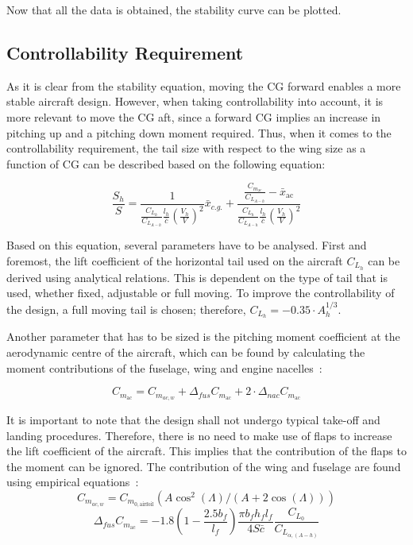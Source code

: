 Now that all the data is obtained, the stability curve can be plotted.

\subsection{Controllability Requirement} \label{subsec:Control_horiz}
As it is clear from the stability equation, moving the CG forward enables a more stable aircraft design.
However, when taking controllability into account, it is more relevant to move the CG aft,
since a forward CG implies an increase in pitching up and a pitching down moment required.
Thus, when it comes to the controllability requirement, the tail size with respect to the wing size as a function of CG can be described based on the following equation:

\begin{equation}
    \label{Eq:Controllability_curve}
    \frac{S_h}{S} = \frac{1}{\frac{C_{L_{h}}}{C_{L_{A-h}}}\frac{l_h}{\bar{c}}\left(\frac{V_h}{V}\right)^2}\bar{x}_{c.g.}+\frac{\frac{C_{m_\text{ac}}}{C_{L_{A-h}}}-\bar{x}_\text{ac}}{\frac{C_{L_{h}}}{C_{L_{A-h}}}\frac{l_h}{\bar{c}}\left(\frac{V_h}{V}\right)^2}
\end{equation}

Based on this equation, several parameters have to be analysed.
First and foremost, the lift coefficient of the horizontal tail used on the aircraft $C_{L_{h}}$ can be derived using analytical relations. This is dependent on the type of tail that is used, whether fixed, adjustable or full moving.
To improve the controllability of the design, a full moving tail is chosen; therefore, $C_{L_h} = -0.35\cdot A_h^{1/3}$.

Another parameter that has to be sized is the pitching moment coefficient at the aerodynamic centre of the aircraft, which can be found by calculating the moment contributions of the fuselage, wing and engine nacelles~\cite{torenbeek_1982}:

\begin{equation}
    \label{eq:C_m_ac}
    C_{m_\text{ac}} = C_{m_{ac,w}} + \Delta_{fus} C_{m_\text{ac}} + 2\cdot \Delta_{nac} C_{m_\text{ac}}
\end{equation}

It is important to note that the design shall not undergo typical take-off and landing procedures.
Therefore, there is no need to make use of flaps to increase the lift coefficient of the aircraft.
This implies that the contribution of the flaps to the moment can be ignored.
The contribution of the wing and fuselage are found using empirical equations~\cite{torenbeek_1982}:
\begin{equation}
    C_{m_{ac,w}} = C_{m_{0,\text{airfoil}}}\left(A\cos^2(\Lambda)/\left(A+2\cos(\Lambda)\right)\right)
\end{equation}
\begin{equation}
    \Delta_{fus} C_{m_\text{ac}} = -1.8\left(1-\frac{2.5b_f}{l_f}\right)\frac{\pi b_fh_fl_f}{4S\bar{c}}\frac{C_{L_0}}{C_{L_{\alpha,(A-h)}}}
\end{equation}

